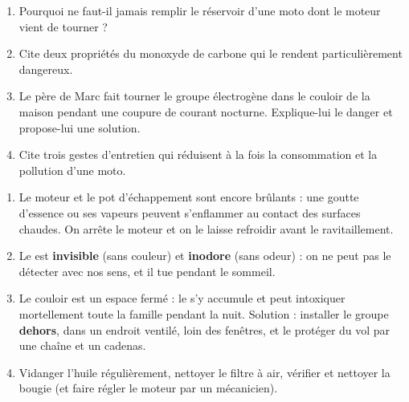 \documentclass[11pt]{article}
\begin{document}
\begin{exercice}
\begin{enumerate}
\item Pourquoi ne faut-il jamais remplir le réservoir d'une moto dont le moteur vient de tourner ?
\item Cite deux propriétés du monoxyde de carbone qui le rendent particulièrement dangereux.
\item Le père de Marc fait tourner le groupe électrogène dans le couloir de la maison pendant une coupure de courant nocturne. Explique-lui le danger et propose-lui une solution.
\item Cite trois gestes d'entretien qui réduisent à la fois la consommation et la pollution d'une moto.
\end{enumerate}
\end{exercice}

\begin{corrige}[Exercice]
\begin{enumerate}
\item Le moteur et le pot d'échappement sont encore brûlants : une goutte d'essence ou ses vapeurs peuvent s'enflammer au contact des surfaces chaudes. On arrête le moteur et on le laisse refroidir avant le ravitaillement.
\item Le  est \textbf{invisible} (sans couleur) et \textbf{inodore} (sans odeur) : on ne peut pas le détecter avec nos sens, et il tue pendant le sommeil.
\item Le couloir est un espace fermé : le  s'y accumule et peut intoxiquer mortellement toute la famille pendant la nuit. Solution : installer le groupe \textbf{dehors}, dans un endroit ventilé, loin des fenêtres, et le protéger du vol par une chaîne et un cadenas.
\item Vidanger l'huile régulièrement, nettoyer le filtre à air, vérifier et nettoyer la bougie (et faire régler le moteur par un mécanicien).
\end{enumerate}
\end{corrige}
\end{document}
